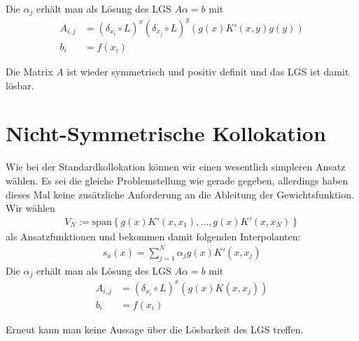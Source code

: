 Die $\alpha_j$ erhält man als Lösung des \ac{LGS} $A\alpha = b$ mit 
\begin{align*}
A_{i,j} &= (\delta_{x_i} \circ L)^x (\delta_{x_j} \circ L)^y (g(x)K'(x,y)g(y))\\
b_i &= f(x_i)
\end{align*}

Die Matrix $A$ ist wieder symmetrisch und positiv definit und das \ac{LGS} ist damit lösbar.
\section{Nicht-Symmetrische Kollokation}
Wie bei der Standardkollokation können wir einen wesentlich simpleren Ansatz wählen. Es sei die gleiche Problemstellung wie gerade gegeben, allerdings haben dieses Mal keine zusätzliche Anforderung an die Ableitung der Gewichtsfunktion. Wir wählen 
\begin{align*}
V_N:= \text{span} \left\{g(x)K'(x,x_1), \dots, g(x)K'(x,x_N)\right\}
\end{align*}
als Ansatzfunktionen und bekommen damit folgenden Interpolanten:
\begin{align*}
s_u (x) = \sum_{j=1}^N \alpha_j g(x)K'(x,x_j)
\end{align*}
Die $\alpha_j$ erhält man als Lösung des \ac{LGS} $A\alpha = b$ mit 
\begin{align*}
A_{i,j} &= (\delta_{x_i} \circ L)^x (g(x) K(x,x_j))\\
b_i &= f(x_i)
\end{align*}

Erneut kann man keine Aussage über die Lösbarkeit des \ac{LGS} treffen.